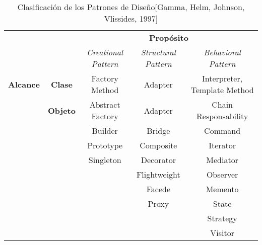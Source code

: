 \begin{center}
    \begin{table}[H]
        \begin{tabular}{|c|c|c|c|c|}
            \cline{3-5}
            \multicolumn{1}{c}{} & \multicolumn{1}{c|}{} & \multicolumn{3}{c|}{\textbf{Propósito}}\\
            \cline{3-5}
            \multicolumn{1}{c}{} & \multicolumn{1}{c|}{} & \multicolumn{1}{c|}{\textit{Creational Pattern}} &
                                   \multicolumn{1}{c|}{\textit{Structural Pattern}} &
                                   \multicolumn{1}{c|}{\textit{Behavioral Pattern}}\\
            \hline
            \textbf{Alcance} & \textbf{Clase}  & Factory Method   & Adapter      & Interpreter, \newline Template Method\\ \cline{2-5}
                             & \textbf{Objeto} & Abstract Factory & Adapter      & Chain Responsability\\
                             &                 & Builder          & Bridge       & Command \\
                             &                 & Prototype        & Composite    & Iterator\\
                             &                 & Singleton        & Decorator    & Mediator\\
                             &                 &                  & Flightweight & Observer\\
                             &                 &                  & Facede       & Memento\\
                             &                 &                  & Proxy        & State\\
                             &                 &                  &              & Strategy\\
                             &                 &                  &              & Visitor\\
            \hline
        \end{tabular}
        \caption{Clasificación de los Patrones de Diseño[Gamma, Helm, Johnson, Vlissides, 1997]}
    \end{table}
\end{center}
\noindent